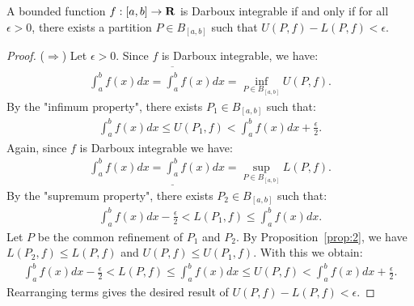 \documentclass[10pt,twoside,openany]{memoir}
\begin{document}
    \begin{theorem}
        A bounded function $f:[a,b] \rightarrow \mathbf{R}$ is Darboux integrable if and only if for all $\epsilon > 0$, there exists a partition $P \in B_{[a,b]}$ such that $U(P,f) - L(P,f) < \epsilon$.
    \end{theorem}
        \begin{proof}
            ($\Rightarrow$) Let $\epsilon > 0$. Since $f$ is Darboux integrable, we have:
                \begin{equation*}
                \begin{split}
                    \int_a^b f(x)dx = \overline{\int_a^b}f(x)dx = \inf_{P \in B_{[a,b]}}U(P,f).
                \end{split}
                \end{equation*}
            By the "infimum property", there exists $P_1 \in B_{[a,b]}$ such that:
                \begin{equation*}
                \begin{split}
                    \int_a^b f(x)dx \leq U(P_1,f) < \int_a^b f(x)dx + \frac{\epsilon}{2}.
                \end{split}
                \end{equation*}
            Again, since $f$ is Darboux integrable we have:
                \begin{equation*}
                \begin{split}
                    \int_a^b f(x)dx = \underline{\int_a^b}f(x)dx = \sup_{P \in B_{[a,b]}}L(P,f).
                \end{split}
                \end{equation*}
            By the "supremum property", there exists $P_2 \in B_{[a,b]}$ such that:
                \begin{equation*}
                \begin{split}
                    \int_a^b f(x)dx - \frac{\epsilon}{2} < L(P_1,f) \leq \int_a^b f(x)dx .
                \end{split}
                \end{equation*}
            Let $P$ be the common refinement of $P_1$ and $P_2$. By Proposition~\ref{prop:2}, we have $L(P_2,f) \leq L(P,f)$ and $U(P,f) \leq U(P_1,f)$. With this we obtain:
                \begin{equation*}
                \begin{split}
                    \int_a^b f(x)dx - \frac{\epsilon}{2} < L(P,f) \leq \int_a^b f(x)dx \leq U(P,f) < \int_a^b f(x)dx + \frac{\epsilon}{2}.
                \end{split}
                \end{equation*}
            Rearranging terms gives the desired result of $U(P,f) - L(P,f) < \epsilon$.


\end{proof}
\end{document}
